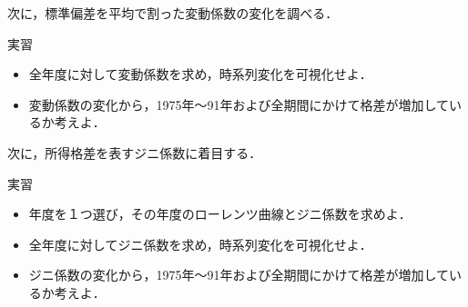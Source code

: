 %

%
\vspace{0.5cm}
次に，標準偏差を平均で割った変動係数の変化を調べる．

%
\begin{itembox}[l]{実習}
%
\begin{itemize}
\item
全年度に対して変動係数を求め，時系列変化を可視化せよ．
\item
変動係数の変化から，1975年〜91年および全期間にかけて格差が増加しているか考えよ．
\end{itemize}
%
\end{itembox}
%


%
\vspace{0.5cm}
次に，所得格差を表すジニ係数に着目する．
%

%
\begin{itembox}[l]{実習}
%
\begin{itemize}
\item
年度を１つ選び，その年度のローレンツ曲線とジニ係数を求めよ．
\item
全年度に対してジニ係数を求め，時系列変化を可視化せよ．
\item
ジニ係数の変化から，1975年〜91年および全期間にかけて格差が増加しているか考えよ．
\end{itemize}
%
\end{itembox}
%




